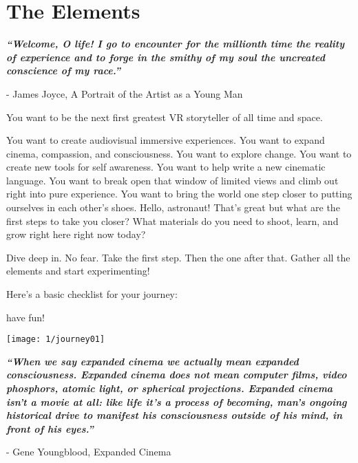 \section{The Elements}
\pagecolor{white}
\label{chap:1}
\begin{fullwidth}

{\itshape\bfseries “Welcome, O life! I go to encounter for the millionth time the reality of experience and to forge in the smithy of my soul the uncreated conscience of my race.”}

- James Joyce, A Portrait of the Artist as a Young Man
\vspace{\baselineskip}

\problem

{\large You want to be the next first greatest VR storyteller of all time and space. \par}

You want to create audiovisual immersive experiences. You want to expand cinema, compassion, and consciousness. You want to explore change. You want to create new tools for self awareness. You want to help write a new cinematic language. You want to break open that window of limited views and climb out right into pure experience. You want to bring the world one step closer to putting ourselves in each other’s shoes. Hello, astronaut! That’s great but what are the first steps to take you closer? What materials do you need to shoot, learn, and grow right here right now today?

\solution

{\large Dive deep in. No fear. Take the first step. Then the one after that. Gather all the elements and start experimenting! \par}

Here’s a basic checklist for your journey:
\clearpage
{}




have fun!

\texttt{[image: 1/journey01]}
\clearpage

{\itshape\bfseries “When we say expanded cinema we actually mean expanded consciousness. Expanded cinema does not mean computer films, video phosphors, atomic light, or spherical projections. Expanded cinema isn't a movie at all: like life it's a process of becoming, man's ongoing historical drive to manifest his consciousness outside of his mind, in front of his eyes.”}

- Gene Youngblood, Expanded Cinema
\vspace{\baselineskip}

\clearpage
\end{fullwidth}
